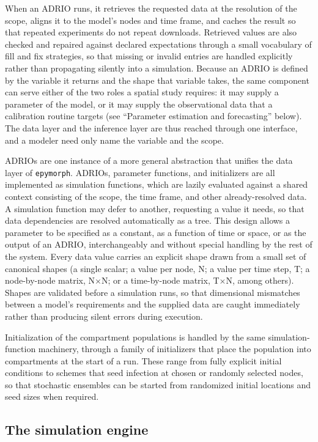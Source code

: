 When an ADRIO runs, it retrieves the requested data at the resolution of the scope, aligns
it to the model's nodes and time frame, and caches the result so that repeated experiments
do not repeat downloads. Retrieved values are also checked and repaired against declared
expectations through a small vocabulary of fill and fix strategies, so that missing or
invalid entries are handled explicitly rather than propagating silently into a simulation.
Because an ADRIO is defined by the variable it returns and the shape that variable takes,
the same component can serve either of the two roles a spatial study requires: it may supply
a parameter of the model, or it may supply the observational data that a calibration routine
targets (see ``Parameter estimation and forecasting'' below). The data layer and the
inference layer are thus reached through one interface, and a modeler need only name the
variable and the scope.

ADRIOs are one instance of a more general abstraction that unifies the data layer of
\texttt{epymorph}. ADRIOs, parameter functions, and initializers are all implemented as
simulation functions, which are lazily evaluated against a shared context consisting of the
scope, the time frame, and other already-resolved data. A simulation function may defer to
another, requesting a value it needs, so that data dependencies are resolved automatically
as a tree. This design allows a parameter to be specified as a constant, as a function of
time or space, or as the output of an ADRIO, interchangeably and without special handling by
the rest of the system. Every data value carries an explicit shape drawn from a small set of
canonical shapes (a single scalar; a value per node, N; a value per time step, T; a
node-by-node matrix, N$\times$N; or a time-by-node matrix, T$\times$N, among others). Shapes are validated
before a simulation runs, so that dimensional mismatches between a model's requirements and
the supplied data are caught immediately rather than producing silent errors during
execution.

Initialization of the compartment populations is handled by the same simulation-function
machinery, through a family of initializers that place the population into compartments at
the start of a run. These range from fully explicit initial conditions to schemes that seed
infection at chosen or randomly selected nodes, so that stochastic ensembles can be started
from randomized initial locations and seed sizes when required.

\subsection{The simulation engine}

